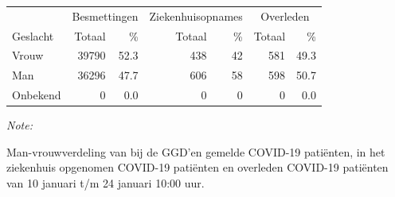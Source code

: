\documentclass[
  english,
  man,floatsintext]{apa6}
\begin{document}
\begin{table}[H]
\centering\begingroup\fontsize{11}{13}\selectfont

\begin{threeparttable}
\begin{tabular}{lrrrrrr}
\toprule
\multicolumn{1}{c}{ } & \multicolumn{2}{c}{Besmettingen} & \multicolumn{2}{c}{Ziekenhuisopnames} & \multicolumn{2}{c}{Overleden} \\
\cmidrule(l{3pt}r{3pt}){2-3} \cmidrule(l{3pt}r{3pt}){4-5} \cmidrule(l{3pt}r{3pt}){6-7}
Geslacht & Totaal & \% & Totaal & \% & Totaal & \%\\
\midrule
Vrouw & 39790 & 52.3 & 438 & 42 & 581 & 49.3\\
Man & 36296 & 47.7 & 606 & 58 & 598 & 50.7\\
Onbekend & 0 & 0.0 & 0 & 0 & 0 & 0.0\\
\bottomrule
\end{tabular}
\begin{tablenotes}
\item \textit{Note: } 
\item Man-vrouwverdeling van bij de GGD’en gemelde COVID-19 patiënten, in het ziekenhuis opgenomen COVID-19 patiënten en overleden COVID-19 patiënten van 10 januari t/m 24 januari 10:00 uur.
\end{tablenotes}
\end{threeparttable}
\endgroup{}
\end{table}
\newpage
\end{document}
